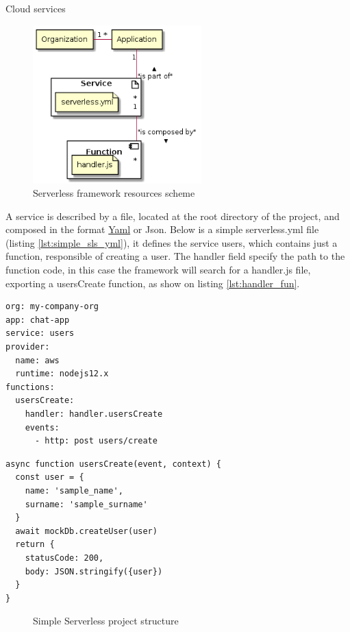 \begin{chapter}{Cloud services}
    \begin{figure}
        \centering
        \includegraphics[width=6.5cm]{source/diagrams/serverless_app_service.png}
        \caption{Serverless framework resources scheme}
        \label{fig:sls_resource_scheme}
    \end{figure}

    A service is described by a file, located at the root directory of the project,
    and composed in the format \href{https://yaml.org/}{Yaml} or Json.
    Below is a simple serverless.yml file (listing \ref{lst:simple_sls_yml}), it
    defines the service users, which contains just a function, responsible of creating
    a user. The handler field specify the path to the function code, in this case
    the framework will search for a handler.js file, exporting a usersCreate function,
    as show on listing \ref{lst:handler_fun}.

    \bigskip
    \begin{lstlisting}[caption=Simple serverless.yml file, label={lst:simple_sls_yml}]
org: my-company-org
app: chat-app
service: users
provider:
  name: aws
  runtime: nodejs12.x
functions:
  usersCreate:
    handler: handler.usersCreate
    events:
      - http: post users/create
    \end{lstlisting}

    \begin{lstlisting}[caption=Simple handler function, label={lst:handler_fun}]
async function usersCreate(event, context) {
  const user = {
    name: 'sample_name',
    surname: 'sample_surname'
  }
  await mockDb.createUser(user)
  return {
    statusCode: 200,
    body: JSON.stringify({user})
  }
}
    \end{lstlisting}

    \begin{figure}
        \begin{minipage}{\linewidth}
        \end{minipage}
        \caption{Simple Serverless project structure}
        \label{fig:sls_project_structure}
    \end{figure}


\end{chapter}
